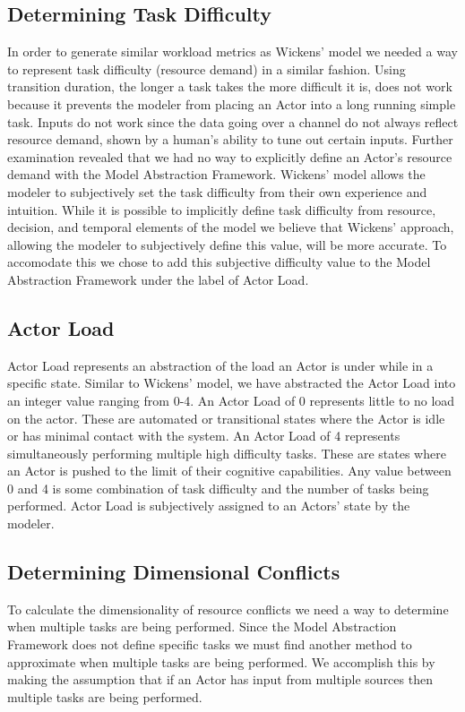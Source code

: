 \subsection{Determining Task Difficulty}
In order to generate similar workload metrics as Wickens' model we needed a way to represent task difficulty (resource demand) in a similar fashion.  Using transition duration, the longer a task takes the more difficult it is, does not work because it prevents the modeler from placing an Actor into a long running simple task.  Inputs do not work since the data going over a channel do not always reflect resource demand, shown by a human's ability to tune out certain inputs.  Further examination revealed that we had no way to explicitly define an Actor's resource demand with the Model Abstraction Framework.  Wickens' model allows the modeler to subjectively set the task difficulty from their own experience and intuition.  While it is possible to implicitly define task difficulty from resource, decision, and temporal elements of the model we believe that Wickens' approach, allowing the modeler to subjectively define this value, will be more accurate.  To accomodate this we chose to add this subjective difficulty value to the Model Abstraction Framework under the label of Actor Load.


  
\subsection{Actor Load}
Actor Load represents an abstraction of the load an Actor is under while in a specific state.  Similar to Wickens' model, we have abstracted the Actor Load into an integer value ranging from 0-4.  An Actor Load of 0 represents little to no load on the actor.  These are automated or transitional states where the Actor is idle or has minimal contact with the system.  An Actor Load of 4 represents simultaneously performing multiple high difficulty tasks.  These are states where an Actor is pushed to the limit of their cognitive capabilities. Any value between 0 and 4 is some combination of task difficulty and the number of tasks being performed.  Actor Load is subjectively assigned to an Actors' state by the modeler.

\subsection{Determining Dimensional Conflicts}
To calculate the dimensionality of resource conflicts we need a way to determine when multiple tasks are being performed.  Since the Model Abstraction Framework does not define specific tasks we must find another method to approximate when multiple tasks are being performed.  We accomplish this by making the assumption that if an Actor has input from multiple sources then multiple tasks are being performed.



